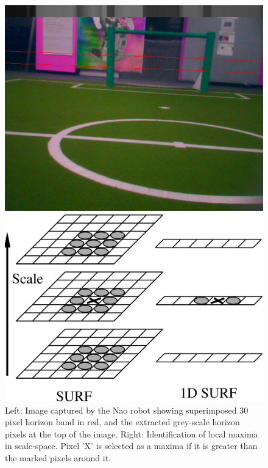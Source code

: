 \documentclass[runningheads,a4paper]{llncs}
\begin{document}
\begin{figure} [h]
\begin{minipage}[b]{0.48\textwidth}
\centering
\includegraphics[width=1\textwidth]{figures/horizon.png}
\end{minipage}
\hspace{0.04\textwidth}
\begin{minipage}[b]{0.48\textwidth}
\centering
\includegraphics[width=1\textwidth]{figures/diagram}
\end{minipage}
\caption{Left: Image captured by the Nao robot showing superimposed 30 pixel horizon band in red, and the extracted grey-scale horizon pixels at the top of the image. Right: Identification of local maxima in scale-space. Pixel 'X' is selected as a maxima if it is greater than the marked pixels around it.} \label{fig:horizon}
\end{figure}
\end{document}

